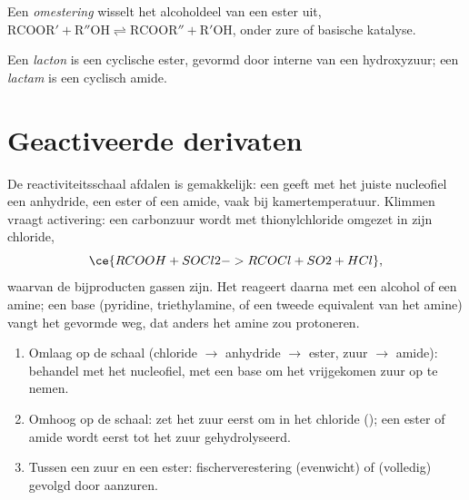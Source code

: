 \begin{definition}[Omestering]\label{def:b2:acyl-substitution:transesterification}
Een \emph{omestering} wisselt het alcoholdeel van een ester uit,
$\mathrm{RCOOR' + R''OH \rightleftharpoons RCOOR'' + R'OH}$, onder zure of basische katalyse.
\end{definition}

\begin{definition}\label{def:b2:acyl-substitution:lactone}
Een \emph{lacton} is een cyclische ester, gevormd door interne  van een
hydroxyzuur; een \emph{lactam} is een cyclisch amide.
\end{definition}

\section{Geactiveerde derivaten}

De reactiviteitsschaal afdalen is gemakkelijk: een  geeft met het juiste nucleofiel een anhydride, een ester of een
amide, vaak bij kamertemperatuur. Klimmen vraagt activering: een
carbonzuur wordt met thionylchloride omgezet in zijn chloride,
\[
  \ce{RCOOH + SOCl2 -> RCOCl + SO2 + HCl} ,
\]
waarvan de bijproducten gassen zijn. Het  reageert daarna met een alcohol of een amine; een base
(pyridine, triethylamine, of een tweede equivalent van het amine) vangt het gevormde  weg, dat
anders het amine zou protoneren.

\begin{method}\label{met:b2:acyl-substitution:ladder}
\begin{enumerate}
  \item Omlaag op de schaal (chloride $\to$ anhydride $\to$ ester, zuur $\to$ amide): behandel met het
        nucleofiel, met een base om het vrijgekomen zuur op te nemen.
  \item Omhoog op de schaal: zet het zuur eerst om in het chloride (); een ester of amide wordt
        eerst tot het zuur gehydrolyseerd.
  \item Tussen een zuur en een ester: fischerverestering (evenwicht) of 
        (volledig) gevolgd door aanzuren.
\end{enumerate}
\end{method}

